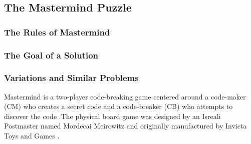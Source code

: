 \documentclass[12pt]{article}  %
\theoremstyle{definition}
\theoremstyle{remark}
\begin{document}
\subsection {The Mastermind Puzzle}

\subsubsection {The Rules of Mastermind}

\subsubsection {The Goal of a Solution}

\subsubsection {Variations and Similar Problems}

Mastermind is a two-player code-breaking game centered around a code-maker (CM) who creates a secret code and a code-breaker (CB) who attempts to discover the code \cite{Wolfram}.The physical board game was designed by an Isreali Postmaster named Mordecai Meirowitz and originally manufactured by Invicta Toys and Games \cite{Invicta}. 
\end{document}
